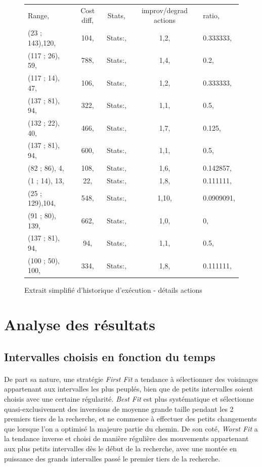 \documentclass[a4paper,10pt]{report}
\begin{document}
\begin{figure}[h]
  \begin{tabular}{lcccl}
    Range,		&Cost diff,	
				&Stats,	&improv/degrad actions	&ratio,\\
    (23  ; 143),120,	&104,	&Stats:,	&1,2,		&0.333333,\\
    (117 ; 26),  59,	&788,	&Stats:,	&1,4,		&0.2,\\
    (117 ; 14),  47,	&106,	&Stats:,	&1,2,		&0.333333,\\
    (137 ; 81),  94,	&322,	&Stats:,	&1,1,		&0.5,\\
    (132 ; 22),  40,	&466,	&Stats:,	&1,7,		&0.125,\\
    (137 ; 81),  94,	&600,	&Stats:,	&1,1,		&0.5,\\
    (82  ; 86),   4,	&108,	&Stats:,	&1,6,		&0.142857,\\
    (1   ; 14),  13,	&22,	&Stats:,	&1,8,		&0.111111,\\
    (25  ; 129),104,	&548,	&Stats:,	&1,10,		&0.0909091,\\
    (91  ; 80), 139,	&662,	&Stats:,	&1,0,		&0,\\
    (137 ; 81),  94,	&94,	&Stats:,	&1,1,		&0.5,\\
    (100 ; 50), 100,	&334,	&Stats:,	&1,8,		&0.111111,\\
  \end{tabular}
  \label{a280-sample-interval-simple-bis}
  \caption{Extrait simplifié d'historique d'exécution - détails actions}
\end{figure}


\pagebreak
\section{Analyse des résultats}

\subsection{Intervalles choisis en fonction du temps}
\paragraph{}
 De part sa nature, une stratégie \textit{First Fit} a tendance à sélectionner
des voisinages appartenant aux intervalles les plus peuplés, bien que de petits
intervalles soient choisis avec une certaine régularité. \textit{Best Fit} est
plus systématique et sélectionne quasi-exclusivement des inversions de moyenne
grande taille pendant les 2 premiers tiers de la recherche, et ne commence à
effectuer des petits changements que lorsque l'on a optimisé la majeure partie
du chemin. De son coté, \textit{Worst Fit} a la tendance inverse et choisi de
manière régulière des mouvements appartenant aux plus petits intervalles dès le
début de la recherche, avec une montée en puissance des grands intervalles passé
le premier tiers de la recherche.
\end{document}
